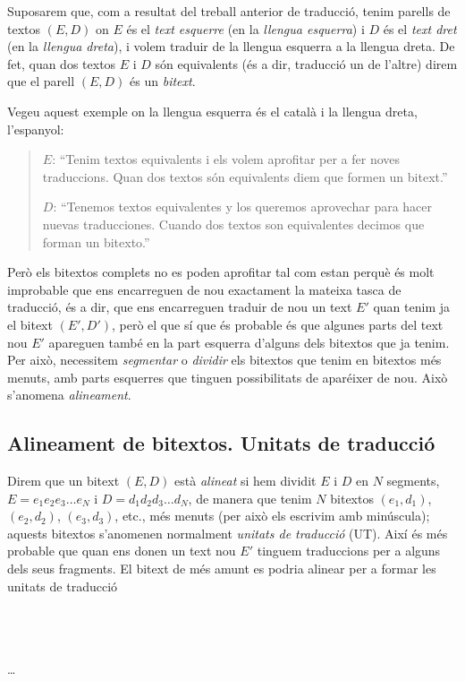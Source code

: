 Suposarem que, com a resultat del treball anterior de traducció, tenim
parells de textos $(E,D)$ on $E$ és el \emph{text esquerre} (en la
\emph{llengua esquerra}) i $D$ és el \emph{text dret} (en la
\emph{llengua dreta}), i volem traduir de la llengua esquerra a la
llengua dreta. De fet, quan dos textos $E$ i $D$ són equivalents (és a
dir, traducció un de l'altre) direm que el parell $(E,D)$ és un
\emph{bitext}.

Vegeu aquest exemple on la llengua esquerra és el català i la llengua
dreta, l'espanyol:
\begin{quote}
  $E$: ``Tenim textos equivalents i els volem aprofitar per a fer noves
      traduccions. Quan dos textos són equivalents diem que formen un
      bitext.''

  $D$: ``Tenemos textos equivalentes y los queremos aprovechar para hacer
      nuevas traducciones. Cuando dos textos son equivalentes decimos
      que forman un bitexto.''
\end{quote}

Però els bitextos complets no es poden aprofitar tal com estan perquè
és molt improbable que ens encarreguen de nou exactament la mateixa
tasca de traducció, és a dir, que ens encarreguen traduir de nou un
text $E'$ quan tenim ja el bitext $(E',D')$, però el que sí que és
probable és que algunes parts del text nou $E'$ apareguen també en la
part esquerra d'alguns dels bitextos que ja tenim. Per això,
necessitem \emph{segmentar} o \emph{dividir} els bitextos que tenim en bitextos més
menuts, amb parts esquerres que tinguen possibilitats de aparéixer de
nou. Això s'anomena \emph{alineament}.

\subsection{Alineament de bitextos. Unitats de traducció}

Direm que un bitext $(E,D)$ està \emph{alineat} si hem dividit $E$ i
$D$ en $N$ segments, $E= e_1 e_2 e_3 \ldots e_N$ i $D= d_1 d_2 d_3
\ldots d_N$, de manera que tenim $N$ bitextos $(e_1,d_1)$,
$(e_2,d_2)$, $(e_3,d_3)$, etc., més menuts (per això els escrivim amb
minúscula); aquests bitextos s'anomenen normalment \emph{unitats de
  traducció} (UT). Així és més probable que quan ens donen un text nou
$E'$ tinguem traduccions per a alguns dels seus fragments. El bitext
de més amunt es podria alinear per a formar les unitats de traducció 
\begin{center}
\\ 
\\ 
\\ 
\ldots\\ 
\end{center}

